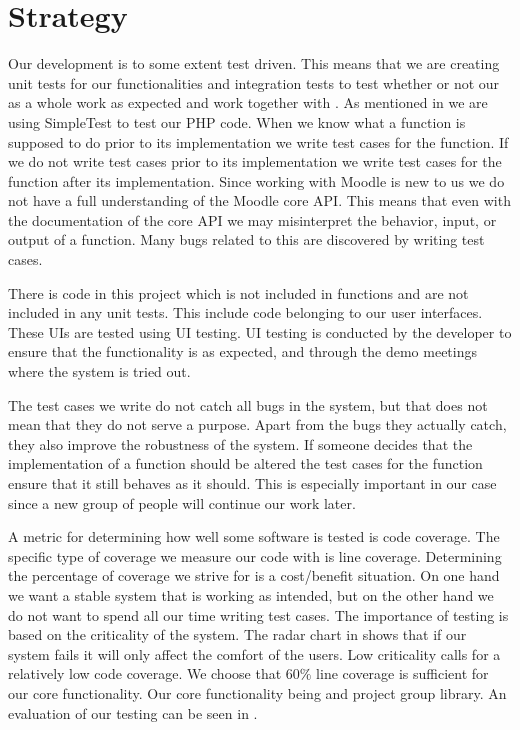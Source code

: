 \section{Strategy}
\label{sec:strategy}
\newcommand{\idealCC}{\todo{gerne en kilde p\aa{} at det er et godt tal}$60\%$}
Our development is to some extent test driven.
This means that we are creating unit tests for our functionalities and integration tests to test whether or not our \subsystem{} as a whole work as expected and work together with \moodle{}.
As mentioned in  we are using SimpleTest to test our PHP code.
When we know what a function is supposed to do prior to its implementation we write test cases for the function.
If we do not write test cases prior to its implementation we write test cases for the function after its implementation. 
Since working with Moodle is new to us we do not have a full understanding of the Moodle core API.
This means that even with the documentation of the \moodle{} core API we may misinterpret the behavior, input, or output of a function.
Many bugs related to this are discovered by writing test cases.

There is code in this project which is not included in functions and are not included in any unit tests.
This include code belonging to our user interfaces.
These UIs are tested using UI testing. 
UI testing is conducted by the developer to ensure that the functionality is as expected, and through the demo meetings where the system is tried out. 

The test cases we write do not catch all bugs in the system, but that does not mean that they do not serve a purpose.
Apart from the bugs they actually catch, they also improve the robustness of the system.
If someone decides that the implementation of a function should be altered the test cases for the function ensure that it still behaves as it should.
This is especially important in our case since a new group of people will continue our work later.

A metric for determining how well some software is tested is code coverage. 
The specific type of coverage we measure our code with is line coverage. 
Determining the percentage of coverage we strive for is a cost/benefit situation.
On one hand we want a stable system that is working as intended, but on the other hand we do not want to spend all our time writing test cases.
The importance of testing is based on the criticality of the system.
The radar chart in  shows that if our system fails it will only affect the comfort of the users.
Low criticality calls for a relatively low code coverage.
We choose that \idealCC{} line coverage is sufficient for our core functionality.
Our core functionality being \admlib{} and project group library.
An evaluation of our testing can be seen in .


